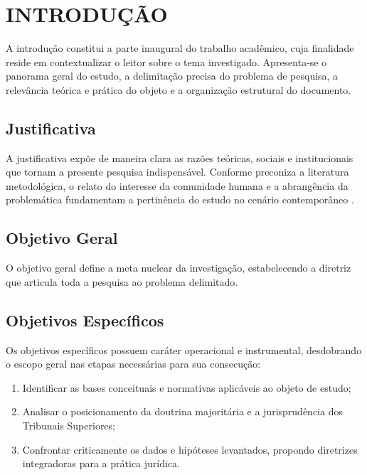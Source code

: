 \documentclass[
    12pt,               %
    openright,          %
    oneside,            %
    a4paper,            %
    english,            %
    brazil              %
]{abntex2}
\begin{document}
\chapter{INTRODUÇÃO}
\label{cap:introducao}

A introdução constitui a parte inaugural do trabalho acadêmico, cuja finalidade reside em contextualizar o leitor sobre o tema investigado. Apresenta-se o panorama geral do estudo, a delimitação precisa do problema de pesquisa, a relevância teórica e prática do objeto e a organização estrutural do documento.

\section{Justificativa}
\label{sec:justificativa}
A justificativa expõe de maneira clara as razões teóricas, sociais e institucionais que tornam a presente pesquisa indispensável. Conforme preconiza a literatura metodológica, o relato do interesse da comunidade humana e a abrangência da problemática fundamentam a pertinência do estudo no cenário contemporâneo \cite{gil2002metodos}.

\section{Objetivo Geral}
\label{sec:obj_geral}
O objetivo geral define a meta nuclear da investigação, estabelecendo a diretriz que articula toda a pesquisa ao problema delimitado.

\section{Objetivos Específicos}
\label{sec:obj_especificos}
Os objetivos específicos possuem caráter operacional e instrumental, desdobrando o escopo geral nas etapas necessárias para sua consecução:
\begin{enumerate}
    \item Identificar as bases conceituais e normativas aplicáveis ao objeto de estudo;
    \item Analisar o posicionamento da doutrina majoritária e a jurisprudência dos Tribunais Superiores;
    \item Confrontar criticamente os dados e hipóteses levantados, propondo diretrizes integradoras para a prática jurídica.
\end{enumerate}
\end{document}
